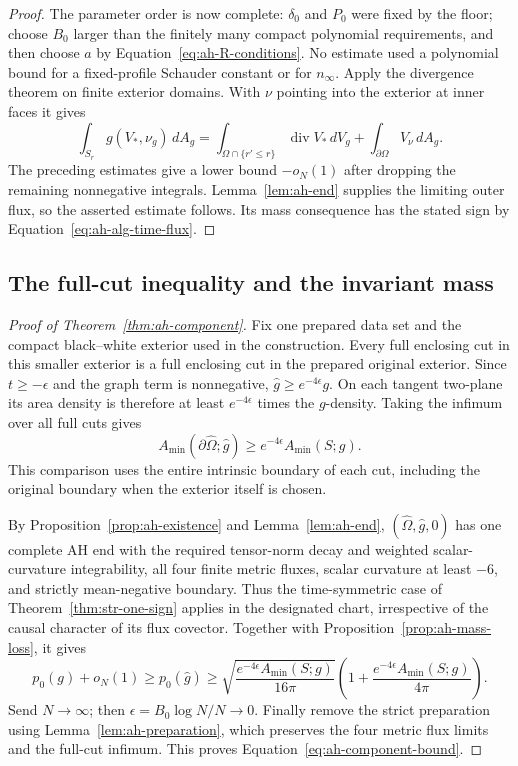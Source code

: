 \begin{proof}
The parameter order is now complete: \(\delta_0\) and \(P_0\)
were fixed by the floor; choose \(B_0\) larger than the finitely
many compact polynomial requirements, and then choose \(a\) by
Equation~\eqref{eq:ah-R-conditions}. No estimate used a polynomial
bound for a fixed-profile Schauder constant or for \(n_\infty\).
Apply the divergence theorem on finite exterior domains. With
\(\nu\) pointing into the exterior at inner faces it gives
\[
 \int_{S_r}g(V_*,\nu_g)\,dA_g
 =\int_{\Omega\cap\{r'\le r\}}\operatorname{div}V_*\,dV_g
      +\int_{\partial\Omega}V_\nu\,dA_g .
\]
The preceding estimates give a lower bound \(-o_N(1)\) after
dropping the remaining nonnegative integrals. Lemma~\ref{lem:ah-end}
supplies the limiting outer flux, so the asserted estimate follows.
Its mass consequence has the stated sign by
Equation~\eqref{eq:ah-alg-time-flux}.
\end{proof}

\subsection{The full-cut inequality and the invariant mass}
\label{subsec:ah-conclusion}

\begin{proof}[Proof of Theorem~\ref{thm:ah-component}]
Fix one prepared data set and the compact black--white exterior used
in the construction. Every full enclosing cut in this smaller
exterior is a full enclosing cut in the prepared original exterior.
Since \(t\ge-\epsilon\) and the graph term is nonnegative,
\(\widehat g\ge e^{-4\epsilon}g\). On each tangent two-plane its
area density is therefore at least \(e^{-4\epsilon}\) times the
\(g\)-density. Taking the infimum over all full cuts gives
\[
 A_{\min}(\partial\widehat\Omega;\widehat g)
       \ge e^{-4\epsilon}A_{\min}(S;g).
\]
This comparison uses the entire intrinsic boundary of each cut,
including the original boundary when the exterior itself is chosen.

By Proposition~\ref{prop:ah-existence} and Lemma~\ref{lem:ah-end},
\((\widehat\Omega,\widehat g,0)\) has one complete AH end with the
required tensor-norm decay and weighted scalar-curvature
integrability, all four finite metric fluxes, scalar curvature
at least \(-6\), and strictly mean-negative boundary. Thus the
time-symmetric case of Theorem~\ref{thm:str-one-sign} applies
in the designated chart, irrespective of the causal character
of its flux covector. Together with Proposition~\ref{prop:ah-mass-loss},
it gives
\[
 p_0(g)+o_N(1)\ge p_0(\widehat g)
 \ge
 \sqrt{\frac{e^{-4\epsilon}A_{\min}(S;g)}{16\pi}}
 \left(1+\frac{e^{-4\epsilon}A_{\min}(S;g)}{4\pi}\right).
\]
Send \(N\to\infty\); then \(\epsilon=B_0\log N/N\to0\).
Finally remove the strict preparation using
Lemma~\ref{lem:ah-preparation}, which preserves the four metric
flux limits and the full-cut infimum. This proves
Equation~\eqref{eq:ah-component-bound}.
\end{proof}


